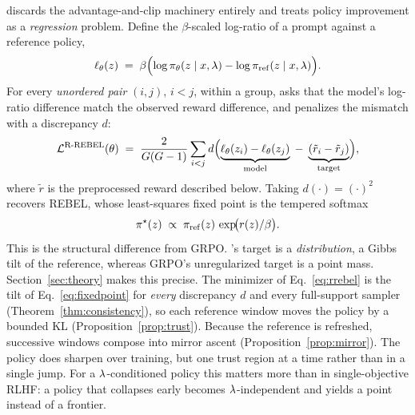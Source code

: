 \rrebel{} discards the advantage-and-clip machinery entirely and treats policy
improvement as a \emph{regression} problem. Define the $\beta$-scaled log-ratio
of a prompt against a reference policy,
\begin{equation}
  \ell_\theta(z) \;=\; \beta\Bigl(\log \pi_\theta(z \mid x, \lambda) - \log \pi_{\mathrm{ref}}(z \mid x, \lambda)\Bigr).
  \label{eq:logratio}
\end{equation}
For every \emph{unordered pair} $(i,j)$, $i<j$, within a group, \rrebel{} asks
that the model's log-ratio difference match the observed reward difference, and
penalizes the mismatch with a discrepancy $d$:
\begin{equation}
  \mathcal{L}^{\text{R-REBEL}}(\theta)
  \;=\; \frac{2}{G(G-1)} \sum_{i<j}
        d\Bigl(
          \underbrace{\ell_\theta(z_i) - \ell_\theta(z_j)}_{\text{model}}
          \;-\;
          \underbrace{(\tilde{r}_i - \tilde{r}_j)}_{\text{target}}
        \Bigr),
  \label{eq:rrebel}
\end{equation}
where $\tilde{r}$ is the preprocessed reward described below. Taking
$d(\cdot) = (\cdot)^2$ recovers REBEL, whose least-squares fixed point is the
tempered softmax
\begin{equation}
  \pi^\star(z) \;\propto\; \pi_{\mathrm{ref}}(z)\,\exp\!\bigl(r(z)/\beta\bigr).
  \label{eq:fixedpoint}
\end{equation}
This is the structural difference from GRPO. \rrebel{}'s target is a
\emph{distribution}, a Gibbs tilt of the reference, whereas GRPO's
unregularized target is a point mass. Section~\ref{sec:theory} makes this
precise. The minimizer of Eq.~\eqref{eq:rrebel} is the tilt of
Eq.~\eqref{eq:fixedpoint} for \emph{every} discrepancy $d$ and every
full-support sampler (Theorem~\ref{thm:consistency}), so each reference window
moves the policy by a bounded KL (Proposition~\ref{prop:trust}). Because the
reference is refreshed, successive windows compose into mirror ascent
(Proposition~\ref{prop:mirror}). The policy does sharpen over training, but one
trust region at a time rather than in a single jump. For a $\lambda$-conditioned
policy this matters more than in single-objective RLHF: a policy that collapses
early becomes $\lambda$-independent and yields a point instead of a frontier.

